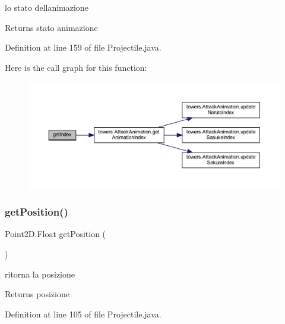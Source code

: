 lo stato dell\textquotesingle{}animazione 

\begin{DoxyReturn}{Returns}
stato animazione 
\end{DoxyReturn}


Definition at line 159 of file Projectile.\+java.

Here is the call graph for this function\+:\nopagebreak
\begin{figure}[H]
\begin{center}
\leavevmode
\includegraphics[width=350pt]{classobjects_1_1_projectile_a59d053c950ff1e9f8a004d493f34e754_cgraph}
\end{center}
\end{figure}
\mbox{\label{classobjects_1_1_projectile_a6b73c36e7bd98fd9cfbffa2ff11cc10e}} 
\subsubsection{\texorpdfstring{get\+Position()}{getPosition()}}
{\footnotesize\ttfamily Point2\+D.\+Float get\+Position (\begin{DoxyParamCaption}{ }\end{DoxyParamCaption})}



ritorna la posizione 

\begin{DoxyReturn}{Returns}
posizione 
\end{DoxyReturn}


Definition at line 105 of file Projectile.\+java.

